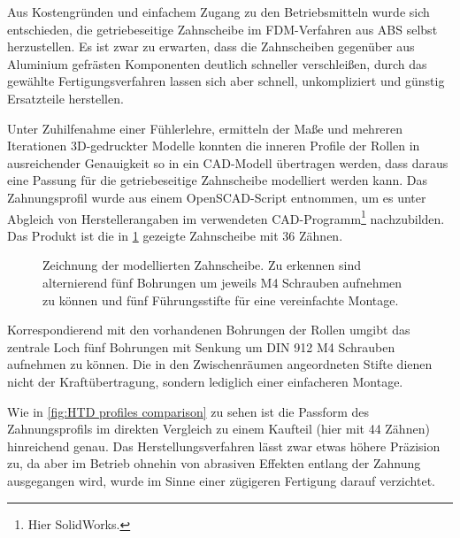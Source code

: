 		Aus Kostengründen und einfachem Zugang zu den Betriebsmitteln wurde sich entschieden, die getriebeseitige Zahnscheibe im FDM-Verfahren aus ABS selbst herzustellen.
		Es ist zwar zu erwarten, dass die Zahnscheiben gegenüber aus Aluminium gefrästen Komponenten deutlich schneller verschleißen, durch das gewählte Fertigungsverfahren lassen sich aber schnell, unkompliziert und günstig Ersatzteile herstellen.\par\medskip
		Unter Zuhilfenahme einer Fühlerlehre, ermitteln der Maße und mehreren Iterationen 3D-gedruckter Modelle konnten die inneren Profile der Rollen in ausreichender Genauigkeit so in ein CAD-Modell übertragen werden, dass daraus eine Passung für die getriebeseitige Zahnscheibe modelliert werden kann.
		Das Zahnungsprofil wurde aus einem OpenSCAD-Script\cite{thingiverse.tooth.profiles.2012} entnommen, um es unter Abgleich von Herstellerangaben\cite{gates.catalogue.2021,GatesCorporation.drive.design.manual.2014} im verwendeten CAD-Programm\footnote{Hier SolidWorks.} nachzubilden.
		Das Produkt ist die in \cref{fig:htd 5m driven} gezeigte Zahnscheibe mit 36 Zähnen.
		\begin{figure}[h]
			\centering
			
			\caption[Zeichnung der modellierten Zahnscheibe]{Zeichnung der modellierten Zahnscheibe. Zu erkennen sind alternierend fünf Bohrungen um jeweils M4 Schrauben aufnehmen zu können und fünf Führungsstifte für eine vereinfachte Montage.}
			\label{fig:htd 5m driven}
		\end{figure}
		Korrespondierend mit den vorhandenen Bohrungen der Rollen umgibt das zentrale Loch fünf Bohrungen mit Senkung um DIN 912 M4 Schrauben aufnehmen zu können.
		Die in den Zwischenräumen angeordneten Stifte dienen nicht der Kraftübertragung, sondern lediglich einer einfacheren Montage.\par
		Wie in \cref{fig:HTD profiles comparison} zu sehen ist die Passform des Zahnungsprofils im direkten Vergleich zu einem Kaufteil (hier mit 44 Zähnen) hinreichend genau.
		Das Herstellungsverfahren lässt zwar etwas höhere Präzision zu, da aber im Betrieb ohnehin von abrasiven Effekten entlang der Zahnung ausgegangen wird, wurde im Sinne einer zügigeren Fertigung darauf verzichtet.
